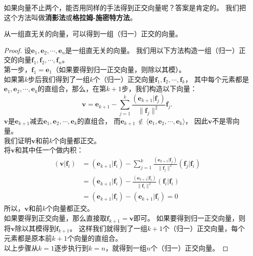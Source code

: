 \documentclass[12pt,UTF8]{ctexbook}
\begin{document}
如果向量不止两个，能否用同样的手法得到正交向量呢？答案是肯定的。
我们把这个方法叫做\textbf{消影法}或\textbf{格拉姆-施密特方法}。

\begin{pp}\label{pp:7_5}
    从一组直无关的向量，可以得到一组（归一）正交的向量。
\end{pp}

\begin{proof} %
    设$\mathbf{e}_1, \mathbf{e}_2, \cdots , \mathbf{e}_n$是一组直无关的向量。
    我们用以下方法构造一组（归一）正交的向量$\mathbf{f}_1, \mathbf{f}_2, \cdots , \mathbf{f}_n$。\\
    第一步，$\mathbf{f}_1 = \mathbf{e}_1$（如果要得到归一正交向量，则除以其模）。\\
    如果第$k$步后我们得到了一组$k$个（归一）正交向量$\mathbf{f}_1, \mathbf{f}_2, \cdots , \mathbf{f}_k$，
    其中每个元素都是$\mathbf{e}_1, \mathbf{e}_2, \cdots , \mathbf{e}_k$的直组合，那么，在第$k+1$步，我们构造以下向量：
    $$ \mathbf{v} = \mathbf{e}_{k+1} - \sum_{j=1}^k \frac{(\mathbf{e}_{k+1}|\mathbf{f}_j)}{\|\mathbf{f}_j\|^2} \mathbf{f}_j.$$
    $ \mathbf{v}$是$\mathbf{e}_{k+1}$减去$\mathbf{e}_1, \mathbf{e}_2, \cdots , \mathbf{e}_{k}$的直组合，
    而$\mathbf{e}_{k+1}\,\notin \, \langle \mathbf{e}_1, \mathbf{e}_2, \cdots , \mathbf{e}_{k} \rangle$，
    因此$\mathbf{v}$不是零向量。\\
    我们证明$ \mathbf{v}$和前$k$个向量都正交。\\
    将$ \mathbf{v}$和其中任一个做内积：
    \begin{align*} 
        (\mathbf{v} | \mathbf{f}_i) &= (\mathbf{e}_{k+1} | \mathbf{f}_i) - \sum_{j=1}^k \frac{(\mathbf{e}_{k+1}|\mathbf{f}_j)}{\|\mathbf{f}_j\|^2} (\mathbf{f}_j | \mathbf{f}_i)  \\
        &= (\mathbf{e}_{k+1} | \mathbf{f}_i) - \frac{(\mathbf{e}_{k+1}|\mathbf{f}_i)}{\|\mathbf{f}_i\|^2} (\mathbf{f}_i | \mathbf{f}_i)  \\
        &= (\mathbf{e}_{k+1} | \mathbf{f}_i) - (\mathbf{e}_{k+1} | \mathbf{f}_i) = 0 
    \end{align*}
    所以，$\mathbf{v}$和前$k$个向量都正交。\\
    如果要得到正交向量，那么直接取$\mathbf{f}_{k+1} = \mathbf{v}$即可。
    如果要得到归一正交向量，则将$\mathbf{v}$除以其模得到$\mathbf{f}_{k+1}$。
    这样我们就得到了一组$k+1$个（归一）正交向量，每个元素都是原本前$k+1$个向量的直组合。\\
    以上步骤从$k=1$逐步执行到$k=n$，就得到一组$n$个（归一）正交向量。

\end{proof}
\end{document}
